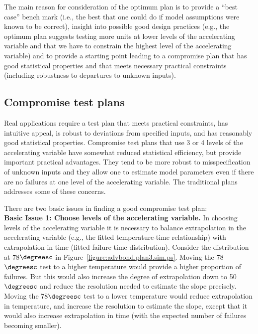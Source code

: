 The main reason for consideration of the optimum plan is to provide
a ``best case'' bench mark (i.e., the best that one could do if
model assumptions were known to be correct), insight into possible
good design practices (e.g., the optimum plan suggests testing more
units at lower levels of the accelerating variable and that we have
to constrain the highest level of the accelerating variable) and to
provide a starting point leading to a compromise plan that has good
statistical properties and that meets necessary practical
constraints (including robustness to departures to unknown inputs).

\subsection{Compromise test plans}
\label{section:comptestplan}
Real applications require a test plan that meets practical
constraints, has intuitive appeal, is robust to deviations from
specified inputs, and has reasonably good statistical properties.
Compromise test plans that use 3 or 4 levels of 
the accelerating variable have somewhat
reduced statistical efficiency, but provide important practical
advantages. They tend to be more robust to misspecification of
unknown inputs and they allow one to estimate model parameters even
if there are no failures at one level of the accelerating
variable. The traditional plans addresses some of these concerns.

There are two basic issues in finding a good compromise test plan:\\[1ex]

{\bf Basic Issue 1: Choose levels of the accelerating variable.} In
choosing levels of the accelerating variable it is necessary to
balance extrapolation in the accelerating variable (e.g., the fitted
temperature-time relationship) with extrapolation in time (fitted
failure time distribution). Consider the distribution at
78$\degreesc$ in Figure~\ref{figure:advbond.plan3.sim.ps}. Moving
the 78$\degreesc$ test to a higher temperature would provide a
higher proportion of failures.  But this would also increase the
degree of extrapolation down to 50$\degreesc$ and reduce the
resolution needed to estimate the slope precisely. Moving the
78$\degreesc$ test to a lower temperature would reduce extrapolation
in temperature, and increase the resolution to estimate the slope, except
that it would also increase extrapolation in time (with the expected
number of failures becoming smaller).

